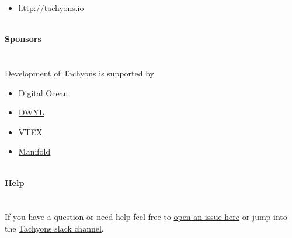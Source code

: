 \documentclass{article}
\begin{document}
\begin{itemize}
	\item http://tachyons.io
\end{itemize}
\\
{\noindent \LARGE \textbf{Sponsors}}\\\\
\\
Development of Tachyons is supported by\\
\begin{itemize}
	\item \href{https://digitalocean.com}{Digital Ocean}
	\item \href{https://dwyl.com}{DWYL}
	\item \href{https://vtex.com}{VTEX}
	\item \href{https://manifold.co}{Manifold}
\end{itemize}
\\
{\noindent \LARGE \textbf{Help}}\\\\
\\
If you have a question or need help feel free to \href{https://github.com/tachyons-css/tachyons/issues/new}{open an issue here} or jump into the \href{http://tachyons-slack-invite.herokuapp.com}{Tachyons slack channel}.\\
\end{document}
